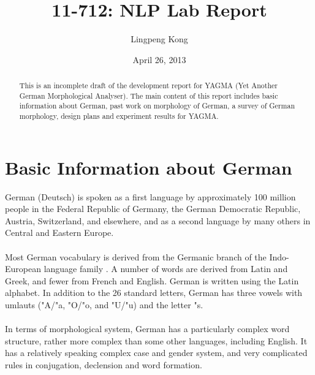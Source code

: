 \documentclass[11pt,letterpaper]{article}
\title{11-712:  NLP Lab Report}
\author{Lingpeng Kong}
\date{April 26, 2013}
\begin{document}
\maketitle
\renewcommand{\abstractname}{Abstract}
\renewcommand{\tablename}{Table}
\begin{abstract}
This is an incomplete draft of the development report for YAGMA (Yet Another German Morphological Analyser). The main content of this report includes basic information about German, past work on morphology of German, a survey of German morphology, design plans and experiment results for YAGMA.
\end{abstract}


\section{Basic Information about German}
German (Deutsch) is spoken as a first language by approximately 100 million people in the Federal Republic of Germany, the German Democratic Republic, Austria, Switzerland, and elsewhere, and as a second language by many others in Central and Eastern Europe. \citep{fox}\\\\
Most German vocabulary is derived from the Germanic branch of the Indo-European language family \citep{ec}. A number of words are derived from Latin and Greek, and fewer from French and English. German is written using the Latin alphabet. In addition to the 26 standard letters, German has three vowels with umlauts ("A/"a, "O/"o, and "U/"u) and the letter "s.\\\\
In terms of morphological system, German has a particularly complex word structure, rather more complex than some other languages, including English. \citep{fox} It has a relatively speaking complex case and gender system, and very complicated rules in conjugation, declension and word formation.
\end{document}

